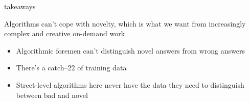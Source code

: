 \documentclass[presentation]{subfiles}
\begin{document}
\begin{frame}

\end{frame}

\begin{frame}{takeaways}
  
Algorithms can't cope with novelty, which is what we want from increasingly complex and creative on-demand work

\begin{itemize}
  \item Algorithmic foremen can't distinguish novel answers from wrong answers
  \item There's a catch--22 of training data
  \item Street-level algorithms here never have the data they need to distinguish between bad and novel
\end{itemize}

\end{frame}
\end{document}
